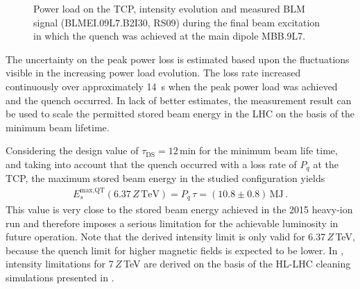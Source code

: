 \begin{figure}[t]
  \centering
  \caption{Power load on the TCP, intensity evolution and measured BLM signal (BLMEI.09L7.B2I30, RS09) during the final beam excitation in which the quench was achieved at the main dipole MBB.9L7.}  
  \label{pic:16071101}
  \end{figure}



\newpage
The uncertainty on the peak power loss is estimated based upon the fluctuations visible in the increasing power load evolution. The loss rate increased continuously over approximately 14~s when the peak power load was achieved and the quench occurred. In lack of better estimates, the measurement result can be used to scale the permitted stored beam energy in the LHC on the basis of the minimum beam lifetime. 

Considering the design value of $\tau_\text{DS}=12\,\text{min}$ for the minimum beam life time, and taking into account that the quench occurred with a loss rate of $P_q$ at the TCP, the maximum stored beam energy in the studied configuration yields
%
\begin{align}
  E_s^\text{max,QT} (6.37\,Z\,\text{TeV}) = P_q \, \tau = (10.8 \pm 0.8) \, \text{MJ} \, . \label{qt:es}
\end{align}  
%
This value is very close to the stored beam energy achieved in the 2015 heavy-ion run and therefore imposes a serious limitation for the achievable luminosity in future operation. Note that the derived intensity limit is only valid for 6.37$\,Z\,$TeV, because the quench limit for higher magnetic fields is expected to be lower. In , intensity limitations for 7$\,Z\,$TeV are derived on the basis of the HL-LHC cleaning simulations presented in . %

